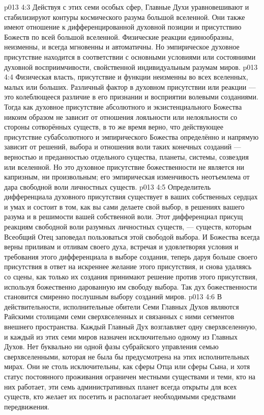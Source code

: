\vs p013 4:3 Действуя с этих семи особых сфер, Главные Духи уравновешивают и стабилизируют контуры космического разума большой вселенной. Они также имеют отношение к дифференцированной духовной позиции и присутствию Божеств по всей большой вселенной. Физические реакции единообразны, неизменны, и всегда мгновенны и автоматичны. Но эмпирическое духовное присутствие находится в соответствии с основными условиями или состояниями духовной восприимчивости, свойственной индивидуальным разумам миров.
\vs p013 4:4 \pc Физическая власть, присутствие и функции неизменны во всех вселенных, малых или больших. Различный фактор в духовном присутствии или реакции --- это колеблющееся различие в его признании и восприятии волевыми созданиями. Тогда как духовное присутствие абсолютного и экзистенциального Божества никоим образом не зависит от отношения лояльности или нелояльности со стороны сотворённых существ, в то же время верно, что действующее присутствие субабсолютного и эмпирического Божества определённо и напрямую зависит от решений, выбора и отношения воли таких конечных созданий --- верностью и преданностью отдельного существа, планеты, системы, созвездия или вселенной. Но это духовное присутствие божественности не является ни капризным, ни произвольным; его эмпирическая изменчивость неотъемлема от дара свободной воли личностных существ.
\vs p013 4:5 Определитель дифференциала духовного присутствия существует в ваших собственных сердцах и умах и состоит в том, как вы сами делаете свой выбор, в решениях вашего разума и в решимости вашей собственной воли. Этот дифференциал присущ реакциям свободной воли разумных личностных существ, --- существ, которым Всеобщий Отец заповедал пользоваться этой свободой выбора. И Божества всегда верны приливам и отливам своего духа, встречая и удовлетворяя условия и требования этого дифференциала в выборе создания, теперь даруя больше своего присутствия в ответ на искреннее желание этого присутствия, и снова удаляясь со сцены, как только их создания принимают решение против этого присутствия, используя божественно дарованную им свободу выбора. Так дух божественности становится смиренно послушным выбору созданий миров.
\vs p013 4:6 \pc В действительности, исполнительные обители Семи Главных Духов являются Райскими столицами семи сверхвселенных и связанных с ними сегментов внешнего пространства. Каждый Главный Дух возглавляет одну сверхвселенную, и каждый из этих семи миров назначен исключительно одному из Главных Духов. Нет буквально ни одной фазы субрайского управления семью сверхвселенными, которая не была бы предусмотрена на этих исполнительных мирах. Они не столь исключительны, как сферы Отца или сферы Сына, и хотя статус постоянного проживания ограничен местными существами и теми, кто на них работает, эти семь административных планет всегда открыты для всех существ, кто желает их посетить и располагает необходимыми средствами передвижения.
